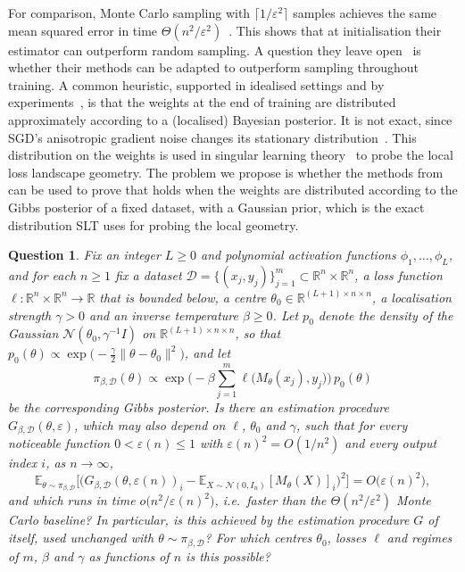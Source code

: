\documentclass[11pt]{article}
\newtheorem{question}{Question}
\theoremstyle{remark}
\begin{document}
For comparison, Monte Carlo sampling with $\lceil 1/\varepsilon^2 \rceil$ samples achieves the same mean squared error in time $\Theta(n^2/\varepsilon^2)$~\cite[Section~2.3]{MSP-ARC}. This shows that at initialisation their estimator can outperform random sampling. A question they leave open~\cite[Section~7.2]{MSP-ARC} is whether their methods can be adapted to outperform sampling throughout training. 
A common heuristic, supported in idealised settings and by experiments~\cite{mandt2017,mingard2021}, is that the weights at the end of training are distributed approximately according to a (localised) Bayesian posterior. 
It is not exact, since SGD's anisotropic gradient noise changes its stationary distribution~\cite{chaudhari2018}. 
This distribution on the weights is used in singular learning theory~\cite{lau2025,chen2023} to probe the local loss landscape geometry.
The problem we propose is whether the methods from \cite{MSP-ARC} can be used to prove that  holds when the weights are distributed according to the Gibbs posterior of a fixed dataset, with a Gaussian prior, which is the exact distribution SLT uses for probing the local geometry.
\begin{question}\label{q:msp-gibbs}
Fix an integer $L \geq 0$ and polynomial activation functions $\phi_1, \dots, \phi_L$, and for each $n \geq 1$ fix a dataset $\mathcal{D} = \{(x_j, y_j)\}_{j=1}^{m} \subset \mathbb{R}^n \times \mathbb{R}^n$, a loss function $\ell \colon \mathbb{R}^n \times \mathbb{R}^n \to \mathbb{R}$ that is bounded below, a centre $\theta_0 \in \mathbb{R}^{(L+1) \times n \times n}$, a localisation strength $\gamma > 0$ and an inverse temperature $\beta \geq 0$. Let $p_0$ denote the density of the Gaussian $\mathcal{N}(\theta_0, \gamma^{-1} I)$ on $\mathbb{R}^{(L+1) \times n \times n}$, so that $p_0(\theta) \propto \exp\big( -\frac{\gamma}{2} \|\theta - \theta_0\|^2 \big)$, and let
\[
    \pi_{\beta, \mathcal{D}}(\theta) \propto \exp\Big( -\beta \sum_{j=1}^{m} \ell\big(M_\theta(x_j), y_j\big) \Big)\, p_0(\theta)
\]
be the corresponding Gibbs posterior. Is there an estimation procedure $G_{\beta, \mathcal{D}}(\theta, \varepsilon)$, which may also depend on $\ell$, $\theta_0$ and $\gamma$, such that for every noticeable function $0 < \varepsilon(n) \leq 1$ with $\varepsilon(n)^2 = O(1/n^2)$ and every output index $i$, as $n \to \infty$,
\[
    \mathbb{E}_{\theta \sim \pi_{\beta, \mathcal{D}}}\Big[ \big( G_{\beta, \mathcal{D}}(\theta, \varepsilon(n))_i - \mathbb{E}_{X \sim \mathcal{N}(0, I_n)}[M_\theta(X)]_i \big)^2 \Big] = O\big(\varepsilon(n)^2\big),
\]
and which runs in time $o\big(n^2/\varepsilon(n)^2\big)$, i.e.\ faster than the $\Theta(n^2/\varepsilon^2)$ Monte Carlo baseline? In particular, is this achieved by the estimation procedure $G$ of  itself, used unchanged with $\theta \sim \pi_{\beta, \mathcal{D}}$? For which centres $\theta_0$, losses $\ell$ and regimes of $m$, $\beta$ and $\gamma$ as functions of $n$ is this possible?
\end{question}
\end{document}
